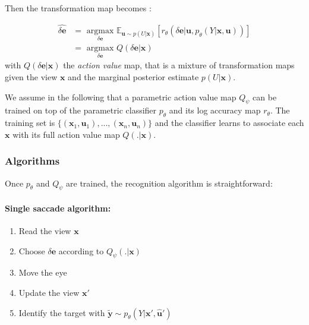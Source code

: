 Then the transformation map becomes :

\begin{align*}
\widehat{\delta\boldsymbol{e}} &= \underset{\delta\boldsymbol{e}}{\text{ argmax }} 
\mathbb{E}_{\boldsymbol{u}\sim p(U|\boldsymbol{x})}\left[r_\theta(\delta\boldsymbol{e}|\boldsymbol{u}, p_\theta(Y|\boldsymbol{x}, \boldsymbol{u}))\right]\\
&= \underset{\delta\boldsymbol{e}}{\text{ argmax }} Q(\delta\boldsymbol{e}|\boldsymbol{x})
\end{align*}
with $Q(\delta\boldsymbol{e}|\boldsymbol{x})$ the \emph{action value} map, that is a mixture of transformation maps given the view $\boldsymbol{x}$ and the marginal posterior estimate $p(U|\boldsymbol{x})$. 

We assume in the following that a parametric action value map $Q_\psi$ can be trained on top of the parametric classifier $p_\theta$ and its log accuracy map $r_\theta$.
The training set is $\{(\boldsymbol{x}_1, \boldsymbol{u}_1), ..., (\boldsymbol{x}_n, \boldsymbol{u}_n)\}$ and the classifier learns to associate each $\boldsymbol{x}$ with its full action value map $Q(.|\boldsymbol{x})$. 

\subsubsection{Algorithms}

Once $p_\theta$ and $Q_\psi$ are trained, the recognition algorithm is straightforward:  

\paragraph{Single saccade algorithm:}
\begin{enumerate}
	\item Read the view $\boldsymbol{x}$
	\item Choose $\delta\boldsymbol{e}$ according to $Q_\psi(.|\boldsymbol{x})$
	\item Move the eye 
	\item Update the view $\boldsymbol{x}'$
	\item Identify the target with $\tilde{\boldsymbol{y}} \sim p_\theta(Y|\boldsymbol{x}',\hat{\boldsymbol{u}}')$
\end{enumerate}


